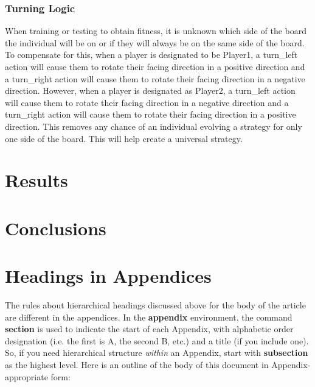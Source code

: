 \documentclass{acm_proc_article-sp}
\begin{document}
\subsubsection{Turning Logic} %

When training or testing to obtain fitness, it is unknown which side of the board the individual will be on or if they will always be on the same side of the board. To compensate for this, when a player is designated to be Player1, a turn\_left action will cause them to rotate their facing direction in a positive direction and a turn\_right action will cause them to rotate their facing direction in a negative direction. However, when a player is designated as Player2, a turn\_left action will cause them to rotate their facing direction in a negative direction and a turn\_right action will cause them to rotate their facing direction in a positive direction. This removes any chance of an individual evolving a strategy for only one side of the board. This will help create a universal strategy.

\section{Results} %



\section{Conclusions} %



%

%
%



\appendix
\section{Headings in Appendices}
The rules about hierarchical headings discussed above for
the body of the article are different in the appendices.
In the \textbf{appendix} environment, the command
\textbf{section} is used to
indicate the start of each Appendix, with alphabetic order
designation (i.e. the first is A, the second B, etc.) and
a title (if you include one).  So, if you need
hierarchical structure
\textit{within} an Appendix, start with \textbf{subsection} as the
highest level. Here is an outline of the body of this
document in Appendix-appropriate form:
\end{document}
